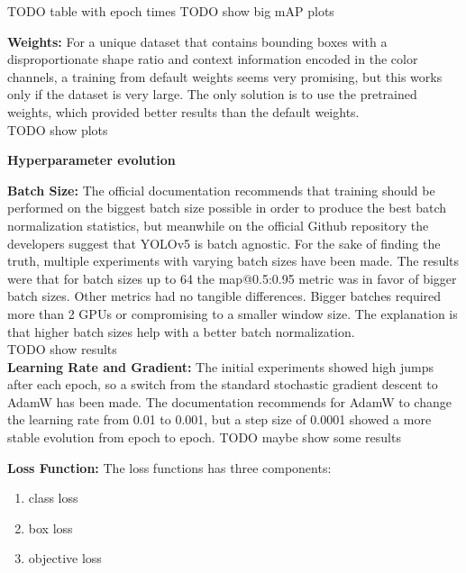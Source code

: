 TODO table with epoch times
TODO show big mAP plots

\textbf{Weights:}
For a unique dataset that contains bounding boxes with a disproportionate shape ratio and context information encoded in the color channels, a training from default weights seems very promising, but this works only if the dataset is very large. The only solution is to use the pretrained weights, which provided better results than the default weights.  \\
TODO show plots

\textbf{Hyperparameter evolution}

\textbf{Batch Size:}
The official documentation recommends that training should be performed on the biggest batch size possible in order to produce the best batch normalization statistics, but meanwhile on the official Github repository the developers suggest that YOLOv5 is batch agnostic. For the sake of finding the truth, multiple experiments with varying batch sizes have been made. The results were that for batch sizes up to 64 the map@0.5:0.95 metric was in favor of bigger batch sizes. Other metrics had no tangible differences. Bigger batches required more than 2 GPUs or compromising to a smaller window size.
The explanation is that higher batch sizes help with a better batch normalization. \\
TODO show results \\

\textbf{Learning Rate and Gradient:}
The initial experiments showed high jumps after each epoch, so a switch from the standard stochastic gradient descent to AdamW has been made. The documentation recommends for AdamW to change the learning rate from 0.01 to 0.001, but a step size of 0.0001 showed a more stable evolution from epoch to epoch.
TODO maybe show some results

\textbf{Loss Function:}
The loss functions has three components:
\begin{enumerate}
  \item class loss
  \item box loss
  \item objective loss
\end{enumerate}

